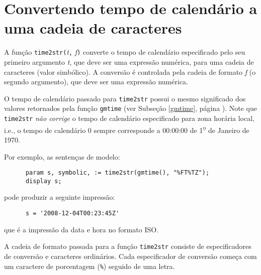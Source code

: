 \documentclass[11pt, brazil]{report}
\begin{document}
%



\section{Convertendo tempo de calendário a uma cadeia de caracteres}
\label{time2str}

A função {\tt time2str(}{\it t}{\tt,} {\it f}{\tt)} converte o tempo
de calendário especificado pelo seu primeiro \linebreak argumento {\it t}, que
deve ser uma expressão numérica, para uma cadeia de caracteres
(valor \linebreak simbólico). A conversão é controlada pela cadeia de formato
{\it f} (o segundo argumento), que deve ser uma expressão numérica.

O tempo de calendário passado  para {\tt time2str} possui o mesmo
significado dos valores retornados pela função {\tt gmtime} (ver Subseção
\ref{gmtime}, página \pageref{gmtime}). Note que {\tt time2str}
{\it não corrige} o tempo de calendário especificado para zona horária local,
i.e., o tempo de calendário 0 sempre corresponde a 00:00:00 de
1{\textsuperscript{\b{o}}} de Janeiro de 1970.

Por exemplo, as sentenças de modelo:

\begin{verbatim}
      param s, symbolic, := time2str(gmtime(), "%FT%TZ");
      display s;
\end{verbatim}

\noindent pode produzir a seguinte impressão:

\begin{verbatim}
      s = '2008-12-04T00:23:45Z'
\end{verbatim}

\noindent que é a impressão da data e hora no formato ISO.

A cadeia de formato passada para a função {\tt time2str} consiste de
especificadores de conversão e caracteres ordinários. Cada especificador
de conversão começa com um caractere de porcentagem ({\tt\%}) seguido
de uma letra.
\end{document}
